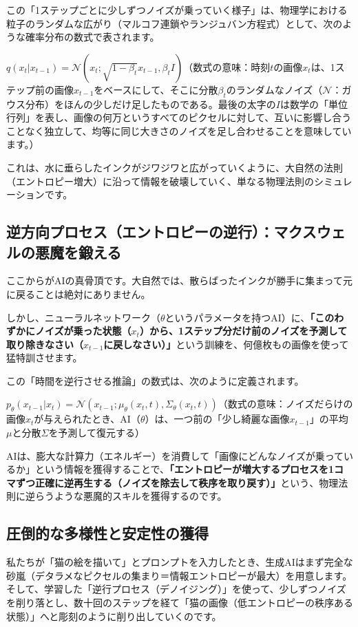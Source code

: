 この「1ステップごとに少しずつノイズが乗っていく様子」は、物理学における粒子のランダムな広がり（マルコフ連鎖やランジュバン方程式）として、次のような確率分布の数式で表されます。

\(q(x_t|x_{t-1})=\mathcal{N}(x_t;\sqrt{1-\beta_t}x_{t-1},\beta_t I)\)（数式の意味：時刻\(t\)の画像\(x_t\)は、1ステップ前の画像\(x_{t-1}\)をベースにして、そこに分散\(\beta_t\)のランダムなノイズ（\(\mathcal{N}\)：ガウス分布）をほんの少しだけ足したものである。最後の太字の\(I\)は数学の「単位行列」を表し、画像の何万というすべてのピクセルに対して、互いに影響し合うことなく独立して、均等に同じ大きさのノイズを足し合わせることを意味しています。）

これは、水に垂らしたインクがジワジワと広がっていくように、大自然の法則（エントロピー増大）に沿って情報を破壊していく、単なる物理法則のシミュレーションです。

\subsection{逆方向プロセス（エントロピーの逆行）：マクスウェルの悪魔を鍛える}

ここからがAIの真骨頂です。大自然では、散らばったインクが勝手に集まって元に戻ることは絶対にありません。

しかし、ニューラルネットワーク（\(\theta\)というパラメータを持つAI）に、\textbf{「このわずかにノイズが乗った状態（\(x_t\)）から、1ステップ分だけ前のノイズを予測して取り除きなさい（\(x_{t-1}\)に戻しなさい）」}という訓練を、何億枚もの画像を使って猛特訓させます。

この「時間を逆行させる推論」の数式は、次のように定義されます。

\(p_\theta(x_{t-1}|x_t)=\mathcal{N}(x_{t-1};\mu_\theta(x_t,t),\Sigma_\theta(x_t,t))\)（数式の意味：ノイズだらけの画像\(x_t\)が与えられたとき、AI（\(\theta\)）は、一つ前の「少し綺麗な画像\(x_{t-1}\)」の平均\(\mu\)と分散\(\Sigma\)を予測して復元する）

AIは、膨大な計算力（エネルギー）を消費して「画像にどんなノイズが乗っているか」という情報を獲得することで、\textbf{「エントロピーが増大するプロセスを1コマずつ正確に逆再生する（ノイズを除去して秩序を取り戻す）」}という、物理法則に逆らうような悪魔的スキルを獲得するのです。

\subsection{圧倒的な多様性と安定性の獲得}

私たちが「猫の絵を描いて」とプロンプトを入力したとき、生成AIはまず完全な砂嵐（デタラメなピクセルの集まり＝情報エントロピーが最大）を用意します。そして、学習した「逆行プロセス（デノイジング）」を使って、少しずつノイズを削り落とし、数十回のステップを経て「猫の画像（低エントロピーの秩序ある状態）」へと彫刻のように削り出していくのです。

